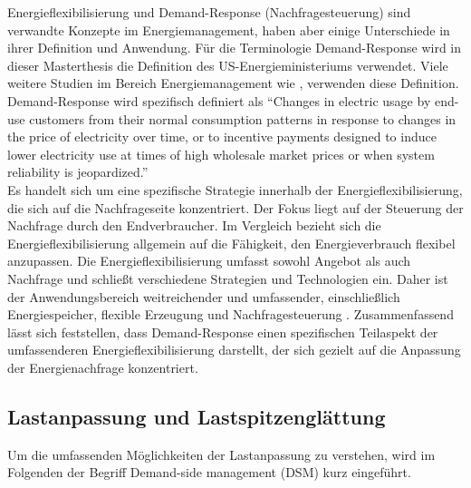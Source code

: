 Energieflexibilisierung und Demand-Response (Nachfragesteuerung) sind verwandte Konzepte im Energiemanagement, haben aber einige Unterschiede in ihrer Definition und Anwendung. Für die Terminologie Demand-Response wird in dieser Masterthesis die Definition des US-Energieministeriums verwendet. Viele weitere Studien im Bereich Energiemanagement wie \cite{waltherMethodologyClassificationCharacterisation2022, vardakasSurveyDemandResponse2014, bayerCurrentPracticeThinking2015}, verwenden diese Definition.\\

Demand-Response wird spezifisch definiert als “Changes in electric usage by end-use customers from their normal consumption patterns in response to changes in the price of electricity over time, or to incentive payments designed to induce lower electricity use at times of high wholesale market prices or when system reliability is jeopardized.” \cite{qdrBenefitsDemandResponse2006}\\

Es handelt sich um eine spezifische Strategie innerhalb der Energieflexibilisierung, die sich auf die Nachfrageseite konzentriert. Der Fokus liegt auf der Steuerung der Nachfrage durch den Endverbraucher. Im Vergleich bezieht sich die Energieflexibilisierung allgemein auf die Fähigkeit, den Energieverbrauch flexibel anzupassen. Die Energieflexibilisierung umfasst sowohl Angebot als auch Nachfrage und schließt verschiedene Strategien und Technologien ein. Daher ist der Anwendungsbereich weitreichender und umfassender, einschließlich Energiespeicher, flexible Erzeugung und Nachfragesteuerung \cite{stawskaDemandResponseCongestion2021}. Zusammenfassend lässt sich feststellen, dass Demand-Response einen spezifischen Teilaspekt der umfassenderen Energieflexibilisierung darstellt, der sich gezielt auf die Anpassung der Energienachfrage konzentriert.


\subsection{Lastanpassung und Lastspitzenglättung}
\label{ch_03Lastanpassung}

Um die umfassenden Möglichkeiten der Lastanpassung zu verstehen, wird im Folgenden der Begriff Demand-side management (DSM) kurz eingeführt.\\

